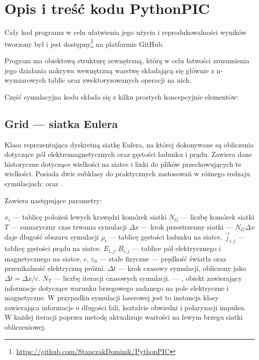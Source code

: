 \section{Opis i treść kodu PythonPIC}
Cały kod programu w celu ułatwienia jego użycia i reprodukowalności wyników tworzony był i jest
dostępny\footnote{\url{https://github.com/StanczakDominik/PythonPIC}} na platformie GitHub.

Program ma obiektową strukturę zewnętrzną, którą w celu łatwości
zrozumienia jego działania nakrywa wewnętrzną warstwę składającą się
głównie z n-wymiarowych tablic  oraz zwektoryzowanych
operacji na nich.

Część symulacyjna kodu składa się z kilku prostych koncepcyjnie elementów:

\subsection{Grid --- siatka Eulera}
Klasa reprezentująca dyskretną siatkę Eulera, na której dokonywane są
obliczenia dotyczące pól elektromagnetycznych oraz gęstości ładunku i
prądu. Zawiera dane historyczne dotyczące wielkości na siatce
i linki do plików  przechowujących te wielkości.
Posiada dwie subklasy do praktycznych zastosowań w różnego rodzaju
symulacjach:  oraz .

Zawiera następujące parametry:
\begin{itemize}
    \itemi{} $x_i$ --- tablicę położeń lewych krawędzi komórek siatki
    \itemi{} $N_G$ --- liczbę komórek siatki
    \itemi{} $T$ --- sumaryczny czas trwania symulacji
    \itemi{} $\Delta x$ --- krok przestrzenny siatki --- $N_G \Delta x$ daje
        długość obszaru symulacji
    \itemi{} $\rho_i$ --- tablicę gęstości ładunku na siatce.
    \itemi{} $\vec{j}_{i,j}$ --- tablicę gęstości prądu na siatce.
    \itemi{} $E_{i,j}, B_{i,j}$ --- tablice pól elektrycznego i magnetycznego na siatce.
    \itemi{} $c$, $\varepsilon_0$ --- stałe fizyczne --- prędkość światła oraz
        przenikalność elektryczną próżni.
    \itemi{} $\Delta t$ --- krok czasowy symulacji, obliczony jako $\Delta t =
        \Delta x / c$.
    \itemi{} $N_T$ --- liczbę iteracji czasowych symulacji.
    \itemi{}  --- , obiekt zawierający informacje dotyczące
        warunku brzegowego zadanego na pole elektryczne i magnetyczne. W przypadku symulacji
        laserowej jest to instancja klasy  zawierająca informacje o
        długości fali, kształcie obwiedni
        i polaryzacji impulsu. W każdej iteracji  poprzez metodę
         aktualizuje wartości na lewym brzegu siatki obliczeniowej.
\end{itemize}

